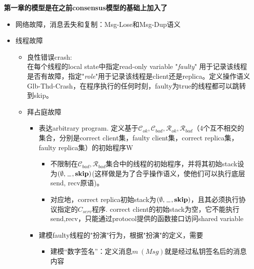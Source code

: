 \documentclass[UTF8, 8pt, a4paper ]{ctexart}
\newcommand{\circline}{
	\mathrel{%
		\raisebox{0.15mm}{
		\begin{tikzpicture}
			\draw[line width=0.35pt] (0,0) circle (2pt);
			\draw[line width=0.35pt] (-1.2mm, 0)--(1.2mm, 0);
		\end{tikzpicture}\ }
	}
}
\newcommand{\clientSet}{\mathcal{C}_{\textit{ok}}}
\newcommand{\replicaSet}{\mathcal{R}_{\textit{ok}}}
\newcommand{\faultyClients}{\mathcal{C}_{\textit{bad}}}
\newcommand{\faultyReplica}{\mathcal{R}_{\textit{bad}}}
\begin{document}
	\fontsize{8pt}{8pt}
	\setlength{\baselineskip}{14pt}
	
	
	
\begin{small}
		
	
	




	\textbf{第一章的模型是在之前consensus模型的基础上加入了}
	\begin{itemize}
		\item 网络故障，消息丢失和复制：Msg-Lose和Msg-Dup语义
		\item 线程故障
		\begin{itemize}
			\item 良性错误crash:\\
			在每个线程的local state中指定read-only variable "\textit{faulty}" 用于记录该线程是否有故障，指定"\textit{role}"用于记录该线程是client还是replica。定义操作语义Glb-Thd-Crash，在程序执行的任何时刻，faulty为true的线程都可以跳转到skip。%
			
			\item 拜占庭故障
			\begin{itemize}
				\item 表达arbitrary program. 定义基于$ \clientSet, \faultyClients, \replicaSet, \faultyReplica $（4个互不相交的集合，分别是correct client集，faulty client集，correct replica集，faulty replica集）的初始程序W
				\begin{itemize}
					\item 不限制在$ \faultyClients, \faultyReplica $集合中的线程的初始程序，并将其初始stack设为$ (\emptyset, \wildcard, \textbf{skip}) $(这样做是为了合乎操作语义，使他们可以执行底层send, recv原语)。
					\item 对应地，correct replica初始stack为$ (\emptyset, \wildcard, \textbf{skip}) $，且其必须执行协议指定的$ C_{serv} $程序. correct client的初始stack为空，它不能执行send,recv，只能通过protocol提供的函数接口访问shared variable
				\end{itemize}
				
				\item 建模faulty线程的"扮演"行为，根据"扮演"的定义，需要
				\begin{itemize}
					\item  建模“数字签名”：定义消息$ m\ (\textit{Msg}) $就是经过私钥签名后的消息内容


\end{itemize}
\end{itemize}
\end{itemize}
\end{itemize}
\end{small}
\end{document}
